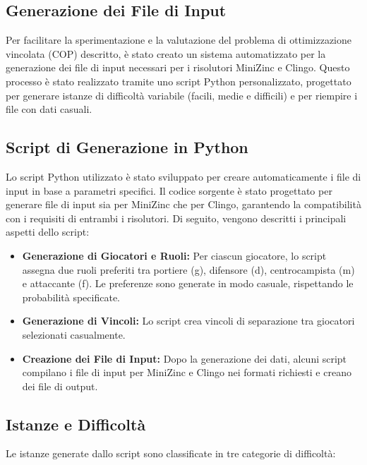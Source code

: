 \documentclass{article}
\begin{document}
\begin{multicols*}{2}
\newpage
\section{Generazione dei File di Input}

Per facilitare la sperimentazione e la valutazione del problema di ottimizzazione vincolata (COP) descritto, è stato creato un sistema automatizzato per la generazione dei file di input necessari per i risolutori MiniZinc e Clingo. Questo processo è stato realizzato tramite uno script Python personalizzato, progettato per generare istanze di difficoltà variabile (facili, medie e difficili) e per riempire i file con dati casuali.

\subsection{Script di Generazione in Python}

Lo script Python utilizzato è stato sviluppato per creare automaticamente i file di input in base a parametri specifici. Il codice sorgente è stato progettato per generare file di input sia per MiniZinc che per Clingo, garantendo la compatibilità con i requisiti di entrambi i risolutori. Di seguito, vengono descritti i principali aspetti dello script:

\begin{itemize}
    \item \textbf{Generazione di Giocatori e Ruoli:} Per ciascun giocatore, lo script assegna due ruoli preferiti tra portiere (g), difensore (d), centrocampista (m) e attaccante (f). Le preferenze sono generate in modo casuale, rispettando le probabilità specificate.
    \item \textbf{Generazione di Vincoli:} Lo script crea vincoli di separazione tra giocatori selezionati casualmente.
    \item \textbf{Creazione dei File di Input:} Dopo la generazione dei dati, alcuni script compilano i file di input per MiniZinc e Clingo nei formati richiesti e creano dei file di output.
\end{itemize}

\subsection{Istanze e Difficoltà}

Le istanze generate dallo script sono classificate in tre categorie di difficoltà:


\end{multicols*}
\end{document}
